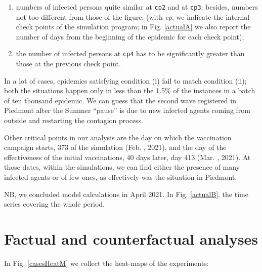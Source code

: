 \documentclass[graybox]{svmult}
\begin{document}
\begin{enumerate}[label=\roman*]
\item numbers of infected persons quite similar at \verb|cp2| and at \verb|cp3|; besides, numbers not too different from those of the figure; 
(with \emph{cp}, we indicate the internal check points of the simulation program; in Fig. \ref{actualA} we also report the number of days from the beginning of the epidemic for each check point); 

\item the number of infected persons at \verb|cp4| has to be significantly greater than those at the previous check point.

\end{enumerate}

In a lot of cases, epidemics satisfying condition (i) fail to match condition (ii); both the situations happen only in less than the 1.5\% of the instances in a batch of ten thousand epidemic. We can guess that the second wave registered in Piedmont after the Summer ``pause'' is due to new infected agents coming from outside and restarting the contagion process.

Other critical points in our analysis are the day on which the vaccination campaign starts, 373 of the simulation (Feb. , 2021), and the day of the effectiveness of the initial vaccinations, 40 days later, day 413 (Mar. , 2021). At those dates, within the simulations, we can find either the presence of many infected agents or of few ones, as effectively was the situation in Piedmont.

NB, we concluded model calculations in April 2021. In Fig. \ref{actualB}, the time series covering the whole period.



\section{Factual and counterfactual analyses}
\label{facCounterfac}

In Fig. \ref{casesHeatM} we collect the heat-maps of the experiments:
\end{document}
